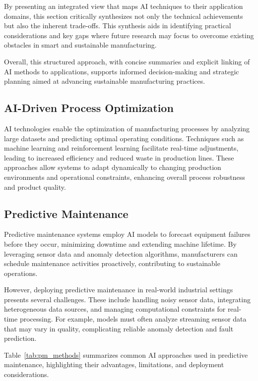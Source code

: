 \documentclass[sigconf]{acmart}
\begin{document}
By presenting an integrated view that maps AI techniques to their application domains, this section critically synthesizes not only the technical achievements but also the inherent trade-offs. This synthesis aids in identifying practical considerations and key gaps where future research may focus to overcome existing obstacles in smart and sustainable manufacturing.

Overall, this structured approach, with concise summaries and explicit linking of AI methods to applications, supports informed decision-making and strategic planning aimed at advancing sustainable manufacturing practices.

\subsection{AI-Driven Process Optimization}
AI technologies enable the optimization of manufacturing processes by analyzing large datasets and predicting optimal operating conditions. Techniques such as machine learning and reinforcement learning facilitate real-time adjustments, leading to increased efficiency and reduced waste in production lines. These approaches allow systems to adapt dynamically to changing production environments and operational constraints, enhancing overall process robustness and product quality.

\subsection{Predictive Maintenance}
Predictive maintenance systems employ AI models to forecast equipment failures before they occur, minimizing downtime and extending machine lifetime. By leveraging sensor data and anomaly detection algorithms, manufacturers can schedule maintenance activities proactively, contributing to sustainable operations.

However, deploying predictive maintenance in real-world industrial settings presents several challenges. These include handling noisy sensor data, integrating heterogeneous data sources, and managing computational constraints for real-time processing. For example, models must often analyze streaming sensor data that may vary in quality, complicating reliable anomaly detection and fault prediction.

Table~\ref{tab:pm_methods} summarizes common AI approaches used in predictive maintenance, highlighting their advantages, limitations, and deployment considerations.
\end{document}
